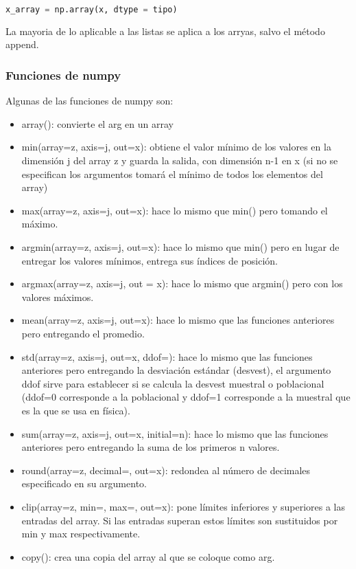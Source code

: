 \documentclass[10pt,oneside]{article}
\begin{document}
\begin{multicols}{2}
                    \begin{lstlisting}[language=Python]
x_array = np.array(x, dtype = tipo)
                    \end{lstlisting}

                    La mayoria de lo aplicable a las listas se aplica a los arryas, salvo el método append. 
                    
                \subsubsection{Funciones de numpy}
                
                Algunas de las funciones de numpy son: 
                
                    \begin{itemize}
                        \item array(): convierte el arg en un array
                        \item min(array=z, axis=j, out=x): obtiene el valor mínimo de los valores en la dimensión j del array z y guarda la salida, con dimensión n-1 en x (si no se especifican los argumentos tomará el mínimo de todos los elementos del array) 
                        \item max(array=z, axis=j, out=x): hace lo mismo que min() pero tomando el máximo. 
                        \item argmin(array=z, axis=j, out=x): hace lo mismo que min() pero en lugar de entregar los valores mínimos, entrega sus índices de posición.
                        \item argmax(array=z, axis=j, out = x): hace lo mismo que argmin() pero con los valores máximos.
                        \item mean(array=z, axis=j, out=x): hace lo mismo que las funciones anteriores pero entregando el promedio.
                        \item std(array=z, axis=j, out=x, ddof=): hace lo mismo que las funciones anteriores pero entregando la desviación estándar (desvest), el argumento ddof sirve para establecer si se calcula la desvest muestral o poblacional (ddof=0 corresponde a la poblacional y ddof=1 corresponde a la muestral que es la que se usa en física).
                        \item sum(array=z, axis=j, out=x, initial=n): hace lo mismo que las funciones anteriores pero entregando la suma de los primeros n valores.
                        \item round(array=z, decimal=, out=x): redondea al número de decimales especificado en su argumento.
                        \item clip(array=z, min=, max=, out=x): pone límites inferiores y superiores a las entradas del array. Si las entradas superan estos límites son sustituidos por min y max respectivamente.
                        \item copy(): crea una copia del array al que se coloque como arg.
                    \end{itemize}


\end{multicols}
\end{document}
